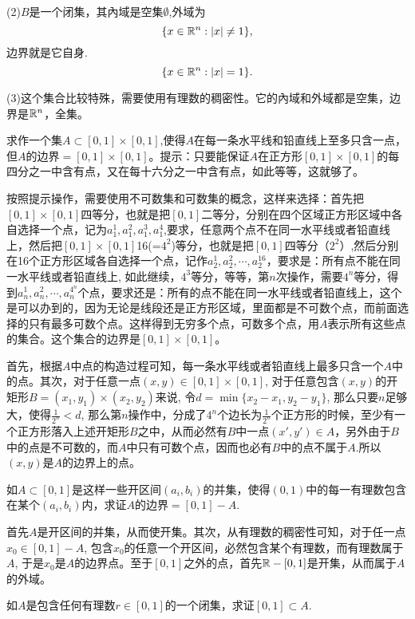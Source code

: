 \begin{problemset}
(2)$B$是一个闭集，其內域是空集$\emptyset$,外域为
\[
\{x \in \mathbb{R}^n: |x| \neq 1 \},
\]
边界就是它自身.
\[
\{x \in \mathbb{R}^n: |x| = 1 \}.
\]

(3)这个集合比较特殊，需要使用有理数的稠密性。它的內域和外域都是空集，边界是$\mathbb{R}^n$，全集。


\item\label{exer009010117} 求作一个集$A \subset [0, 1]\times[0,1]$,使得$A$在每一条水平线和铅直线上至多只含一点，但$A$的边界$=[0, 1] \times [0, 1]$。提示：只要能保证$A$在正方形$[0, 1] \times [0, 1]$的每四分之一中含有点，又在每十六分之一中含有点，如此等等，这就够了。

按照提示操作，需要使用不可数集和可数集的概念，这样来选择：首先把$[0,1]\times [0,1]$四等分，也就是把$[0,1]$二等分，分别在四个区域正方形区域中各自选择一个点，记为$a_1^1, a_1^2, a_1^3, a_1^4$,要求，任意两个点不在同一水平线或者铅直线上，然后把$[0,1]\times [0,1]$16(=$4^2$)等分，也就是把$[0, 1]$四等分（$2^2$）,然后分别在16个正方形区域各自选择一个点，记作$a_2^1,a_2^2, \cdots, a_2^{16}$，要求是：所有点不能在同一水平线或者铅直线上, 如此继续，$4^3$等分，等等，第$n$次操作，需要$4^n$等分，得到$a_n^{1}, a_n^2,\cdots, a_n^{4^n}$个点，要求还是：所有的点不能在同一水平线或者铅直线上，这个是可以办到的，因为无论是线段还是正方形区域，里面都是不可数个点，而前面选择的只有最多可数个点。这样得到无穷多个点，可数多个点，用$A$表示所有这些点的集合。这个集合的边界是$[0, 1] \times [0,1]$。

首先，根据$A$中点的构造过程可知，每一条水平线或者铅直线上最多只含一个$A$中的点。其次，对于任意一点$(x, y) \in [0, 1] \times [0, 1]$, 对于任意包含$(x, y)$的开矩形$B=(x_1, y_1) \times (x_2, y_2)$来说, 令$d = \min\{x_2-x_1, y_2-y_1\}$, 那么只要$n$足够大，使得$\frac{1}{2^n} < d$, 那么第$n$操作中，分成了$4^n$个边长为$\frac{1}{2^n}$个正方形的时候，至少有一个正方形落入上述开矩形$B$之中，从而必然有$B$中一点$(x',y') \in A$，另外由于$B$中的点是不可数的，而$A$中只有可数个点，因而也必有$B$中的点不属于$A$.所以$(x, y)$是$A$的边界上的点。

\item 如$A \subset [0, 1]$是这样一些开区间$(a_i, b_i)$的并集，使得$(0, 1)$中的每一有理数包含在某个$(a_i, b_i)$内，求证$A$的边界$=[0, 1]-A$.

首先$A$是开区间的并集，从而使开集。其次，从有理数的稠密性可知，对于任一点$x_0 \in [0, 1] - A$, 包含$x_0$的任意一个开区间，必然包含某个有理数，而有理数属于$A$, 于是$x_0$是$A$的边界点。至于$[0, 1]$之外的点，首先$\mathbb{R} - [0, 1]$是开集，从而属于$A$的外域。

\item 如$A$是包含任何有理数$r \in [0, 1]$的一个闭集，求证$[0, 1] \subset A$.


\end{problemset}
